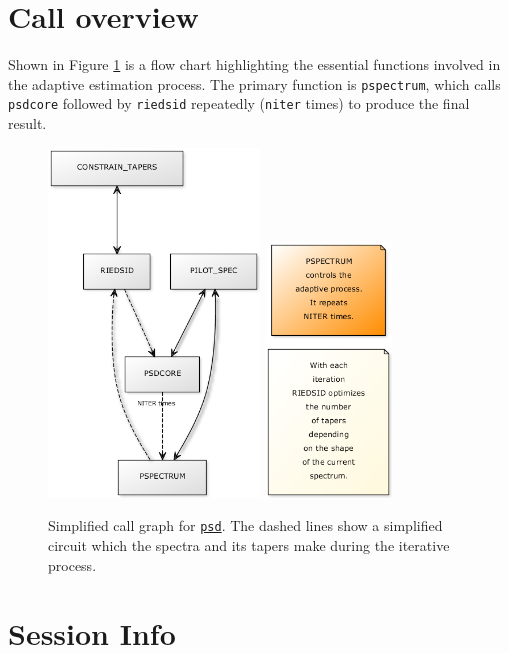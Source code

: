 \documentclass[10pt]{article}\usepackage[]{graphicx}\usepackage[]{color}
\newcommand{\Rcmd}[1]{\texttt{#1}}
\newcommand{\psd}[0]{\href{http://www.github.com/abarbour/psd/}{\color{blue}\Rcmd{psd}}}
\begin{document}

\section{Call overview}

Shown in Figure \ref{fig:calls} is a flow chart highlighting the essential
functions involved in the adaptive estimation process. 
The primary function is \Rcmd{pspectrum}, which calls 
\Rcmd{psdcore} followed by \Rcmd{riedsid} repeatedly (\Rcmd{niter} times)
to produce the final result.

\begin{figure}[!htbp]
 \centering
 \includegraphics[width=0.5\textwidth]{yuml_d.png}%
 \includegraphics[width=0.3\textwidth]{yuml_n.png}
 \caption{Simplified call graph for \psd{}. The dashed lines show a
 simplified circuit
 which the spectra and its tapers make during the iterative process.}
 \label{fig:calls}
\end{figure}

\clearpage

\section*{Session Info}


\clearpage



\end{document}
